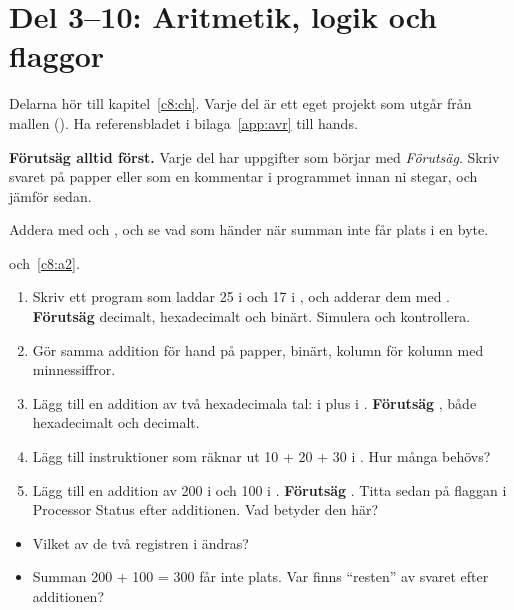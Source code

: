 
\section{Del 3--10: Aritmetik, logik och flaggor}
\label{lab3:sec:b}
Delarna hör till kapitel~\ref{c8:ch}. Varje del är ett eget projekt som utgår från mallen
(). Ha referensbladet i bilaga~\ref{app:avr} till hands.

\textbf{Förutsäg alltid först.} Varje del har uppgifter som börjar med \emph{Förutsäg}. Skriv svaret
på papper eller som en kommentar i programmet innan ni stegar, och jämför sedan.

\label{lab3:d3}
Addera med  och , och se vad som händer när summan inte får plats i en byte.

 och~\ref{c8:a2}.

\begin{enumerate}
  \item Skriv ett program som laddar 25 i  och 17 i , och adderar dem med
    . \textbf{Förutsäg}  decimalt, hexadecimalt och binärt. Simulera
    och kontrollera.
  \item Gör samma addition för hand på papper, binärt, kolumn för kolumn med minnessiffror.
  \item Lägg till en addition av två hexadecimala tal:  i  plus  i
    . \textbf{Förutsäg} , både hexadecimalt och decimalt.
  \item Lägg till instruktioner som räknar ut 10 + 20 + 30 i . Hur många 
    behövs?
  \item Lägg till en addition av 200 i  och 100 i . \textbf{Förutsäg}
    . Titta sedan på flaggan  i Processor Status efter additionen. Vad betyder den
    här?
\end{enumerate}

\begin{itemize}
  \item Vilket av de två registren i  ändras?
  \item Summan 200 + 100 = 300 får inte plats. Var finns \enquote{resten} av svaret efter
    additionen?
\end{itemize}

